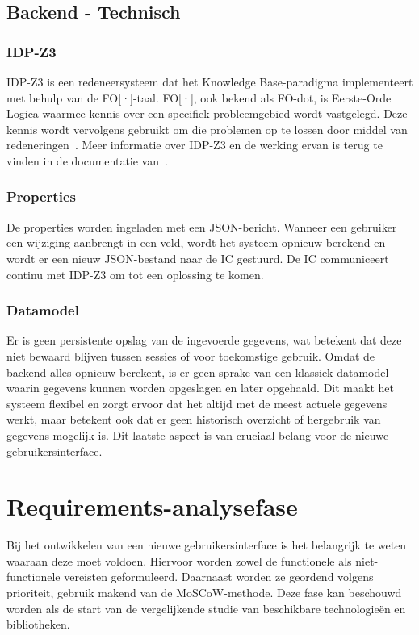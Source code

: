 \subsection{Backend - Technisch}
\subsubsection{IDP-Z3}
IDP-Z3 is een redeneersysteem dat het Knowledge Base-paradigma implementeert met behulp van de FO[·]-taal. FO[·], ook bekend als FO-dot, is Eerste-Orde Logica waarmee kennis over een specifiek probleemgebied wordt vastgelegd. Deze kennis wordt vervolgens gebruikt om die problemen op te lossen door middel van redeneringen~\autocite{Carbonnelle2024}. Meer informatie over IDP-Z3 en de werking ervan is terug te vinden in de documentatie van~\textcite{Carbonnelle2024}.

\subsubsection{Properties}
De properties worden ingeladen met een JSON-bericht. Wanneer een gebruiker een wijziging aanbrengt in een veld, wordt het systeem opnieuw berekend en wo\-rdt er een nieuw JSON-bestand naar de IC gestuurd. De IC communiceert continu met IDP-Z3 om tot een oplossing te komen.

\subsubsection{Datamodel}
Er is geen persistente opslag van de ingevoerde gegevens, wat betekent dat deze niet bewaard blijven tussen sessies of voor toekomstige gebruik. Omdat de backend alles opnieuw berekent, is er geen sprake van een klassiek datamodel waarin gegevens kunnen worden opgeslagen en later opgehaald. Dit maakt het systeem flexibel en zorgt ervoor dat het altijd met de meest actuele gegevens werkt, maar betekent ook dat er geen historisch overzicht of hergebruik van gegevens mogelijk is. Dit laatste aspect is van cruciaal belang voor de nieuwe gebruikersinterface.

\section{Requirements-analysefase}
Bij het ontwikkelen van een nieuwe gebruikersinterface is het belangrijk te weten waaraan deze moet voldoen. Hiervoor worden zowel de functionele als niet-functionele vereisten geformuleerd. Daarnaast worden ze geordend volgens prioriteit, gebruik makend van de MoSCoW-methode. Deze fase kan beschouwd worden als de start van de vergelijken\-de studie van beschikbare technologieën en bibliotheken.

